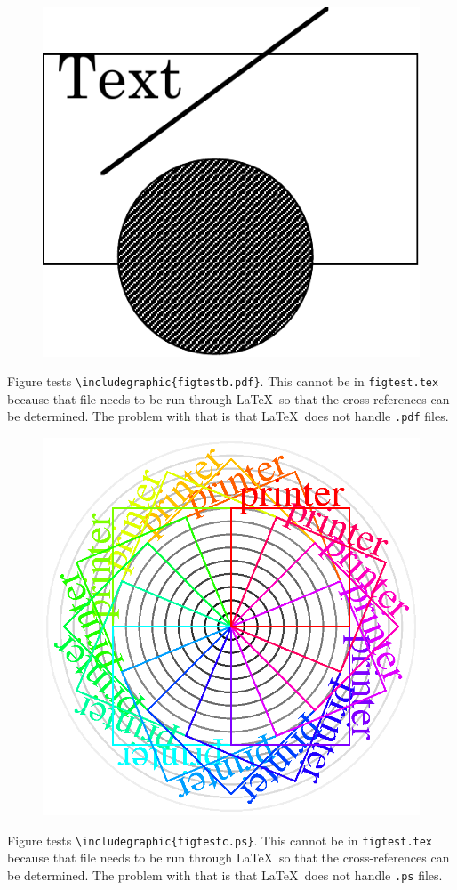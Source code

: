 \documentclass{article}
\begin{document}
\begin{figure}
\includegraphics{figtestb.pdf}
\end{figure}

Figure tests \verb#\includegraphic{figtestb.pdf}#.  This cannot be in
\texttt{figtest.tex} because that file needs to be run through \LaTeX\
so that the cross-references can be determined.  The problem with
that is that \LaTeX\ does not handle \texttt{.pdf} files.  

\begin{figure}
\includegraphics{figtestc.ps}
\end{figure}

Figure tests \verb#\includegraphic{figtestc.ps}#.  This cannot be in
\texttt{figtest.tex} because that file needs to be run through \LaTeX\
so that the cross-references can be determined.  The problem with
that is that \LaTeX\ does not handle \texttt{.ps} files.  
\end{document}
